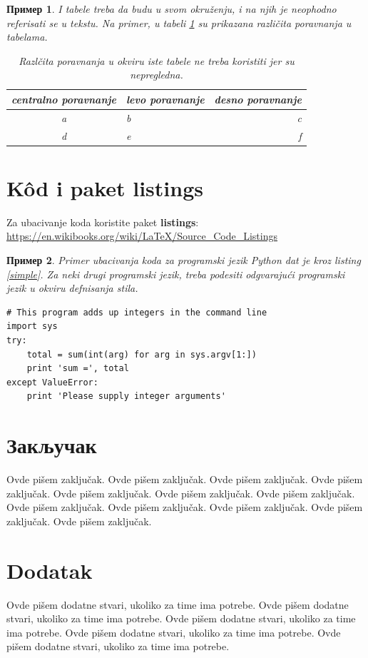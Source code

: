 \documentclass[a4paper]{article}
\newtheorem{primer}{Пример}[section] %
\begin{document}
\begin{primer} I tabele treba da budu u svom okruženju, i na njih je neophodno referisati se u tekstu. Na primer, u tabeli \ref{tab:tabela1} su prikazana različita poravnanja u tabelama.

\begin{table}[h!]
\begin{center}
\caption{Razlčita poravnanja u okviru iste tabele ne treba koristiti jer su nepregledna.}
\begin{tabular}{|c|l|r|} \hline
centralno poravnanje& levo poravnanje& desno poravnanje\\ \hline
a &b&c\\ \hline
d &e&f\\ \hline
\end{tabular}
\label{tab:tabela1}
\end{center}
\end{table}

\end{primer}

\section{K\^{o}d i paket listings}
Za ubacivanje koda koristite paket \textbf{listings}:
\url{https://en.wikibooks.org/wiki/LaTeX/Source_Code_Listings}

\begin{primer}
Primer ubacivanja koda za programski jezik Python dat je kroz listing \ref{simple}. Za neki drugi programski jezik, treba podesiti odgvarajući programski jezik u okviru defnisanja stila.
\end{primer}
\begin{lstlisting}[caption={Primer ubacivanja koda u tekst},frame=single, label=simple]
# This program adds up integers in the command line
import sys
try:
    total = sum(int(arg) for arg in sys.argv[1:])
    print 'sum =', total
except ValueError:
    print 'Please supply integer arguments'
\end{lstlisting}


\section{Закључак}
\label{sec:zakljucak}

Ovde pišem zaključak. 
Ovde pišem zaključak. 
Ovde pišem zaključak. 
Ovde pišem zaključak. 
Ovde pišem zaključak. 
Ovde pišem zaključak. 
Ovde pišem zaključak. 
Ovde pišem zaključak. 
Ovde pišem zaključak. 
Ovde pišem zaključak. 
Ovde pišem zaključak. 
Ovde pišem zaključak. 


\appendix
 


\appendix
\section{Dodatak}
Ovde pišem dodatne stvari, ukoliko za time ima potrebe.
Ovde pišem dodatne stvari, ukoliko za time ima potrebe.
Ovde pišem dodatne stvari, ukoliko za time ima potrebe.
Ovde pišem dodatne stvari, ukoliko za time ima potrebe.
Ovde pišem dodatne stvari, ukoliko za time ima potrebe.
\end{document}
